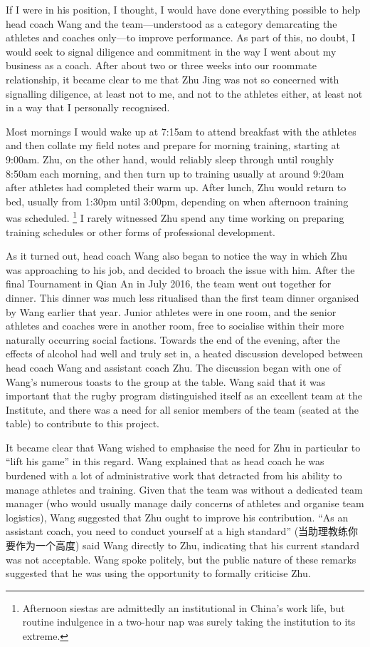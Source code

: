 \begin{CJK}{UTF8}{gbsn}
If I were in his position, I thought, I would have done everything possible to help head coach Wang and the team—understood as  a category demarcating the athletes and coaches only---to improve performance.  As part of this, no doubt, I would seek to signal diligence and commitment in the way I went about my business as a coach.  After about two or three weeks into our roommate relationship, it became clear to me that Zhu Jing was not so concerned with signalling diligence, at least not to me, and not to the athletes either, at least not in a way that I personally recognised.

Most mornings I would wake up at 7:15am to attend breakfast with the athletes and then collate my field notes and prepare for morning training, starting at 9:00am.  Zhu, on the other hand, would reliably sleep through until roughly 8:50am each morning, and then turn up to training usually at around 9:20am after athletes had completed their warm up.  After lunch, Zhu would return to bed, usually from 1:30pm until 3:00pm, depending on when afternoon training was scheduled.  \footnote{Afternoon siestas are admittedly an institutional in China's work life, but routine indulgence in a two-hour nap was surely taking the institution to its extreme.}  I rarely witnessed Zhu spend any time working on preparing training schedules or other forms of professional development.

As it turned out, head coach Wang also began to notice the way in which Zhu was approaching to his job, and decided to broach the issue with him.  After the final Tournament in Qian An in July 2016, the team went out together for dinner.  This dinner was much less ritualised than the first team dinner organised by Wang earlier that year.  Junior athletes were in one room, and the senior athletes and coaches were in another room, free to socialise within their more naturally occurring social factions.  Towards the end of the evening, after the effects of alcohol had well and truly set in, a heated discussion developed between head coach Wang and assistant coach Zhu. The discussion began with one of Wang's numerous toasts to the group at the table.  Wang said that it was important that the rugby program distinguished itself as an excellent team at the Institute, and there was a need for all senior members of the team (seated at the table) to contribute to this project.

It became clear that Wang wished to emphasise the need for Zhu in particular to ``lift his game'' in this regard. Wang explained that as head coach he was burdened with a lot of administrative work that detracted from his ability to manage athletes and training.  Given that the team was without a dedicated team manager (who would usually manage daily concerns of athletes and organise team logistics), Wang suggested that Zhu ought to improve his contribution. ``As an assistant coach, you need to conduct yourself at a high standard'' (当助理教练你要作为一个高度) said Wang directly to Zhu, indicating that his current standard was not acceptable. Wang spoke politely, but the public nature of these remarks suggested that he was using the opportunity to formally criticise Zhu.


\end{CJK}
